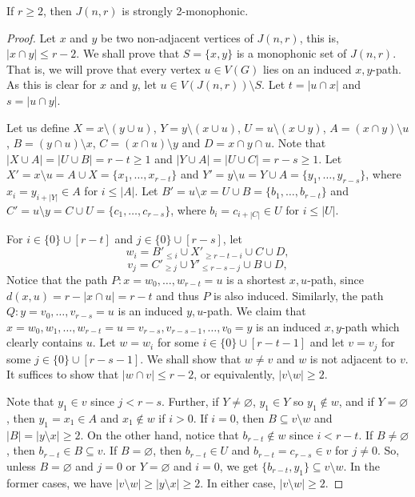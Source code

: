 \documentclass[10pt,a4paper]{amsart}
\renewcommand{\emptyset}{\varnothing}
\begin{document}
\begin{theorem}\label{thm:johnson-strong}
    If $r\geq 2$, then $J(n,r)$ is strongly 2-monophonic.
\end{theorem}

\begin{proof}
    Let $x$ and $y$ be two non-adjacent vertices of $J(n,r)$, this is, $|x\cap y|\leq r-2$. We shall prove that $S=\{x,y\}$ is a monophonic set of $J(n,r)$. That is, we will prove that every vertex $u\in V(G)$ lies on an induced $x,y$-path. 
    As this is clear for $x$ and $y$, let $u\in V(J(n,r))\setminus S$. Let $t=|u\cap x|$ and $s=|u\cap y|$. 
    
    Let us define $X=x\setminus(y\cup u)$, $Y=y\setminus(x\cup u)$, $U=u\setminus(x\cup y)$, $A=(x\cap y)\setminus u$, $B=(y\cap u)\setminus x$, $C=(x\cap u)\setminus y$ and $D=x\cap y\cap u$. Note that $|X\cup A|=|U\cup B|=r-t\geq 1$ and $|Y\cup A|=|U\cup C|=r-s \geq 1$.
    Let $X'=x\setminus u=A\cup X=\{x_1,\ldots,x_{r-t}\}$ and $Y'=y\setminus u=Y\cup A=\{y_1,\ldots,y_{r-s}\}$, where $x_i=y_{i+|Y|}\in A$ for $i\leq |A|$. Let $B'=u\setminus x=U\cup B=\{b_1,\ldots, b_{r-t}\}$ and $C'=u\setminus y=C\cup U=\{c_1,\ldots, c_{r-s}\}$, where $b_i=c_{i+|C|}\in U$ for $i\leq |U|$.
    
    For $i\in \{0\}\cup[r-t]$ and $j\in \{0\}\cup[r-s]$, let
    $$w_i=B'_{\leq i}\cup X'_{\geq r-t-i}\cup C\cup D,$$
    $$v_j=C'_{\geq j}\cup Y'_{\leq r-s-j}\cup B\cup D,$$
    Notice that the path $P:x=w_0,\ldots,w_{r-t}=u$ is a shortest $x,u$-path, since $d(x,u)=r-|x \cap u|=r-t$ and thus $P$ is also induced. Similarly, the path $Q:y=v_0,\ldots,v_{r-s}=u$ is an induced $y,u$-path. 
    We claim that $x=w_0,w_1,\ldots,w_{r-t}=u=v_{r-s},v_{r-s-1},\ldots,v_0=y$ is an induced $x,y$-path which clearly contains $u$.
    Let $w=w_i$ for some $i\in \{0\}\cup [r-t-1]$ and let $v=v_j$ for some $j\in \{0\}\cup [r-s-1]$. We shall show that $w\neq v$ and $w$ is not adjacent to $v$. It suffices to show that $|w\cap v|\leq r-2$, or equivalently, $|v\setminus w|\geq 2$.

    Note that $y_1\in v$ since $j<r-s$. Further, if $Y\neq \emptyset$, $y_1\in Y$ so $y_1\notin w$, and if $Y=\emptyset$, then $y_1=x_1\in A$ and $x_1\notin w$ if $i>0$. If $i=0$, then $B\subseteq v\setminus w$ and $|B|=|y\setminus x|\geq 2$.
    On the other hand, notice that $b_{r-t}\notin w$ since $i<r-t$. If $B\neq\emptyset$, then $b_{r-t}\in B\subseteq v$. If $B=\emptyset$, then $b_{r-t}\in U$ and $b_{r-t}=c_{r-s}\in v$ for $j\neq 0$. 
    So, unless $B=\emptyset$ and $j=0$ or $Y=\emptyset$ and $i=0$, we get $\{b_{r-t},y_1\}\subseteq v\setminus w$.
    In the former cases, we have $|v\setminus w|\geq |y\setminus x|\geq 2$.
    In either case, $|v\setminus w|\geq 2$.
\end{proof}
\end{document}
